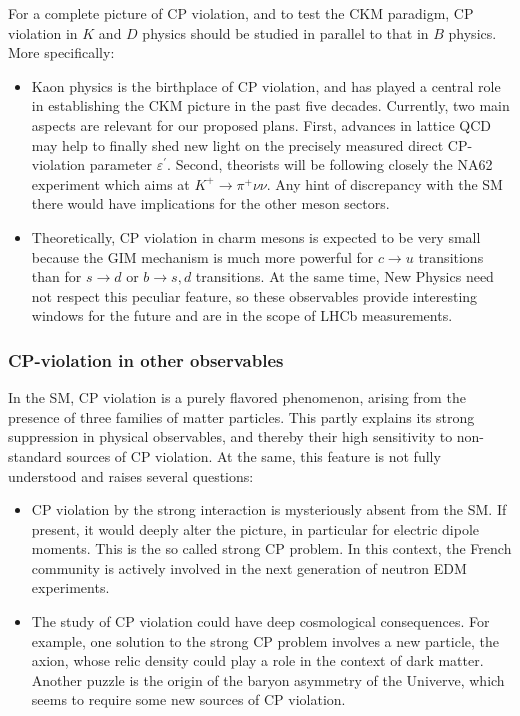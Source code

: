 For a complete picture of CP violation, and to test the CKM paradigm, CP
violation in $K$ and $D$ physics should be studied in parallel to that in $B$
physics. More specifically:

\begin{itemize}
\item Kaon physics is the birthplace of CP violation, and has played a central
role in establishing the CKM picture in the past five decades. Currently, two
main aspects are relevant for our proposed plans. First, advances in lattice
QCD may help to finally shed new light on the precisely measured direct
CP-violation parameter $\varepsilon^{\prime}$. Second, theorists will be
following closely the NA62 experiment which aims at $K^{+}\rightarrow\pi
^{+}\nu\nu$. Any hint of discrepancy with the SM there would have implications
for the other meson sectors.

\item Theoretically, CP violation in charm mesons is expected to be very small
because the GIM mechanism is much more powerful for $c\rightarrow u$
transitions than for $s\rightarrow d$ or $b\rightarrow s,d$ transitions. At
the same time, New Physics need not respect this peculiar feature, so these
observables provide interesting windows for the future and are in the scope of
LHCb measurements.
\end{itemize}

\subsubsection*{CP-violation in other observables}

In the SM, CP violation is a purely flavored phenomenon, arising from the
presence of three families of matter particles. This partly explains its
strong suppression in physical observables, and thereby their high sensitivity
to non-standard sources of CP violation. At the same, this feature is not
fully understood and raises several questions:

\begin{itemize}
\item CP violation by the strong interaction is mysteriously absent from the
SM. If present, it would deeply alter the picture, in particular for electric
dipole moments. This is the so called strong CP problem. In this context, the
French community is actively involved in the next generation of neutron EDM experiments.

\item The study of CP violation could have deep cosmological consequences. For
example, one solution to the strong CP problem involves a new particle, the
axion, whose relic density could play a role in the context of dark matter.
Another puzzle is the origin of the baryon asymmetry of the Univerve, which
seems to require some new sources of CP violation.
\end{itemize}

